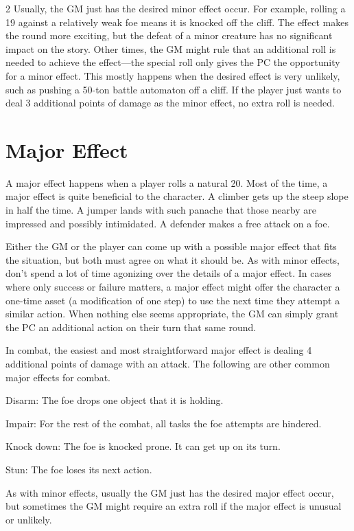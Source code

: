 \begin{multicols}{2}
Usually, the GM just has the desired minor effect occur. For example, rolling a 19 against a relatively weak foe means it is knocked off the cliff. The effect makes the round more exciting, but the defeat of a minor creature has no significant impact on the story. Other times, the GM might rule that an additional roll is needed to achieve the effect—the special roll only gives the PC the opportunity for a minor effect. This mostly happens when the desired effect is very unlikely, such as pushing a 50-ton battle automaton off a cliff. If the player just wants to deal 3 additional points of damage as the minor effect, no extra roll is needed.

\section{Major Effect}

A major effect happens when a player rolls a natural 20. Most of the time, a major effect is quite beneficial to the character. A climber gets up the steep slope in half the time. A jumper lands with such panache that those nearby are impressed and possibly intimidated. A defender makes a free attack on a foe.

Either the GM or the player can come up with a possible major effect that fits the situation, but both must agree on what it should be. As with minor effects, don’t spend a lot of time agonizing over the details of a major effect. In cases where only success or failure matters, a major effect might offer the character a one-time asset (a modification of one step) to use the next time they attempt a similar action. When nothing else seems appropriate, the GM can simply grant the PC an additional action on their turn that same round.

In combat, the easiest and most straightforward
major effect is dealing 4 additional points of damage with an attack. The following are other common major effects for combat.

Disarm: The foe drops one object that it is holding.

Impair: For the rest of the combat, all tasks the foe attempts are hindered.

Knock down: The foe is knocked prone. It can get up on its turn.

Stun: The foe loses its next action.

As with minor effects, usually the GM just has the desired major effect occur, but sometimes the GM might require an extra roll if the major effect is unusual or unlikely.


\end{multicols}
